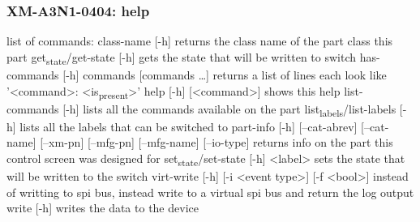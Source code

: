 \documentclass[11pt]{article}
\begin{document}
\subsubsection{XM-A3N1-0404: help}
\label{sec:org60e7dbd}
list of commands:
  class-name [-h]
    returns the class name of the part class this part
  get\textsubscript{state}/get-state [-h]
    gets the state that will be written to switch
  has-commands [-h] commands [commands \ldots{}]
    returns a list of lines each look like '<command>: <is\textsubscript{present}>'
  help [-h] [<command>]
    shows this help
  list-commands [-h]
    lists all the commands available on the part
  list\textsubscript{labels}/list-labels [-h]
    lists all the labels that can be switched to
  part-info  [-h] [--cat-abrev] [--cat-name] [--xm-pn] [--mfg-pn] [--mfg-name]
          [--io-type]
    returns info on the part this control screen was designed for
  set\textsubscript{state}/set-state [-h] <label>
    sets the state that will be written to the switch
  virt-write [-h] [-i <event type>] [-f <bool>]
    instead of writting to spi bus, instead write to a virtual spi bus
    and return the log output
  write [-h]
    writes the data to the device
\end{document}
